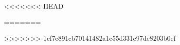 %
\begin{songs}{}
\songcolumns{\canzsongcolumsnumber}
\setcounter{songnum}{\theGlobalSongCounter} %

\makeatletter
{}
\makeatother












<<<<<<< HEAD

=======

>>>>>>> 1cf7e891cb70141482a1e55d331c97dc8203b0ef



\setcounter{GlobalSongCounter}{\thesongnum}
\end{songs}